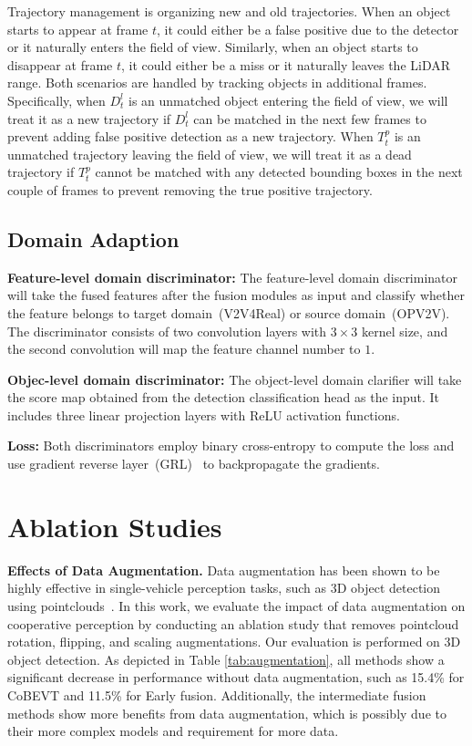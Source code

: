 \documentclass[10pt,twocolumn,letterpaper]{article}
\begin{document}
Trajectory management is organizing new and old trajectories. When an object starts to appear at frame $t$, it could either be a false positive due to the detector or it naturally enters the field of view. Similarly, when an object starts to disappear at frame $t$,  it could either be a miss or it naturally leaves the LiDAR range. Both scenarios are handled by tracking objects in additional frames. Specifically, when $D_t^l$ is an unmatched object entering the field of view, we will treat it as a new trajectory if $D_t^l$ can be matched in the next few frames to prevent adding false positive detection as a new trajectory. When $T_t^p$ is an unmatched trajectory leaving the field of view, we will treat it as a dead trajectory if $T_t^p$ cannot be matched with any detected bounding boxes in the next couple of frames to prevent removing the true positive trajectory. 

\subsection{Domain Adaption}
\textbf{Feature-level domain discriminator:} The feature-level domain discriminator will take the fused features after the fusion modules as input and classify whether the feature belongs to target domain~(V2V4Real) or source domain~(OPV2V). The discriminator consists of two convolution layers with $3\times3$ kernel size, and the second convolution will map the feature channel number to $1$. 

\textbf{Objec-level domain discriminator:} The object-level domain clarifier will take the score map obtained from the detection classification head as the input. It includes three linear projection layers with ReLU activation functions.

\textbf{Loss:} Both discriminators employ binary cross-entropy to compute the loss and use gradient reverse layer~(GRL)~\cite{ganin2015unsupervised} to backpropagate the gradients.

\section{Ablation Studies}
\label{sec:ablation-details}

\noindent\textbf{Effects of Data Augmentation.} Data augmentation has been shown to be highly effective in single-vehicle perception tasks, such as 3D object detection using pointclouds~\cite{lang2019pointpillars,zhou2018voxelnet}. In this work, we evaluate the impact of data augmentation on cooperative perception by conducting an ablation study that removes pointcloud rotation, flipping, and scaling augmentations. Our evaluation is performed on 3D object detection. As depicted in Table \ref{tab:augmentation}, all methods show a significant decrease in performance without data augmentation, such as 15.4\% for CoBEVT and 11.5\% for Early fusion. Additionally, the intermediate fusion methods show more benefits from data augmentation, which is possibly due to their more complex models and requirement for more data.
\end{document}
